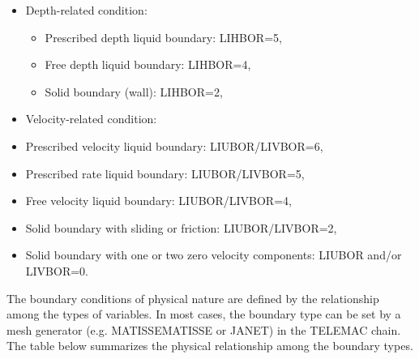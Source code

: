 \begin{itemize}
\item Depth-related condition:

\begin{itemize}
\item Prescribed depth liquid boundary: LIHBOR=5,

\item Free depth liquid boundary: LIHBOR=4,

\item Solid boundary (wall): LIHBOR=2,
\end{itemize}

\item Velocity-related condition:

\item Prescribed velocity liquid boundary: LIUBOR/LIVBOR=6,

\item Prescribed rate liquid boundary: LIUBOR/LIVBOR=5,

\item Free velocity liquid boundary: LIUBOR/LIVBOR=4,

\item Solid boundary with sliding or friction: LIUBOR/LIVBOR=2,

\item Solid boundary with one or two zero velocity components: LIUBOR and/or
LIVBOR=0.
\end{itemize}

The boundary conditions of physical nature are defined by the relationship
among the types of variables. In most cases, the boundary type can be set by a
mesh generator (e.g. MATISSEMATISSE or JANET) in the TELEMAC chain. The table
below summarizes the physical relationship among the boundary types.


